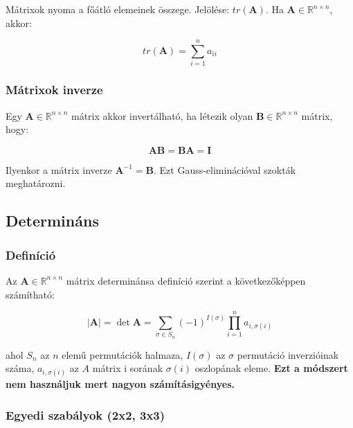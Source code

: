 \documentclass{article}
\begin{document}
Mátrixok nyoma a főátló elemeinek összege. Jelölése: $tr(\mathbf{A})$. \newline Ha $\mathbf{A} \in \mathbb{R}^{n \times n}$, akkor:

\begin{equation*}
    tr(\mathbf{A}) = \sum_{i = 1}^{n} a_{ii}
\end{equation*}

\subsubsection{Mátrixok inverze}

Egy $\mathbf{A} \in \mathbb{R}^{n \times n}$ mátrix akkor invertálható, ha létezik olyan $\mathbf{B} \in \mathbb{R}^{n \times n}$ mátrix, hogy:

\begin{equation*}
    \mathbf{A} \mathbf{B} = \mathbf{B} \mathbf{A} = \mathbf{I}
\end{equation*}

Ilyenkor a mátrix inverze $\mathbf{A}^{-1} = \mathbf{B}$. Ezt Gauss-eliminációval szokták meg\-határozni.


\subsection{Determináns}

\subsubsection{Definíció}

Az $\mathbf{A} \in \mathbb{R}^{n \times n}$ mátrix determinánsa definíció szerint a kö\-vet\-ke\-ző\-kép\-pen szá\-mít\-hat\-ó:

\begin{equation*}
    \left\lvert \mathbf{A} \right\rvert = \det \mathbf{A} = \sum_{\sigma \in S_n} (-1)^{I(\sigma)} \prod_{i = 1}^{n} a_{i,\sigma(i)}
\end{equation*}

ahol $S_n$ az $n$ elemű permutációk halmaza, $I(\sigma)$ az $\sigma$ permutáció inverzióinak száma, $a_{i,\sigma(i)}$ az $A$ mátrix i sorának $\sigma(i)$ oszlopának eleme. \textbf{Ezt a módszert nem használjuk mert nagyon számításigyényes.}

\subsubsection{Egyedi szabályok (2x2, 3x3)}
\end{document}
